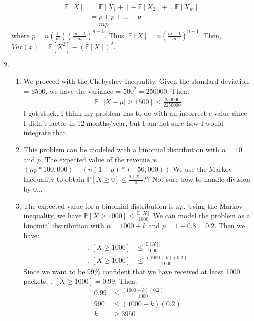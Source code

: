 \documentclass[a4paper]{article}
\newcommand{\E}{\mathbb{E}}
\renewcommand{\P}{\mathbb{P}}
\newcommand{\<}{\langle}
\renewcommand{\>}{\rangle}
\renewcommand{\^}{\wedge}
\begin{document}
\begin{enumerate}
\begin{align*}
            \E[X] &= \E[X_1 +] + \E[X_2] + ... \E[X_m]\\
            &= p + p + ... + p\\
            &= mp
        \end{align*}
    where $p = n(\frac{1}{m})(\frac{m-1}{m})^{n-1}$. Thus, $\E[X] = n(\frac{m-1}{m})^{n-1}$. Then, $Var(x) = \E[X^2] - (\E[X])^2$. 
    \item 
        \begin{enumerate}
            \item
                We proceed with the Chebyshev Inequality. Given the standard deviation = \$500, we have the variance = $500^2 = 250000$. Then:
                    \begin{align*}
                        \P[|X-\mu| \geq 1500] \leq \frac{250000}{2250000}
                    \end{align*}
                I got stuck. I think my problem has to do with an incorrect c value since I didn't factor in 12 months/year, but I am not sure how I would integrate that.
            \item
                This problem can be modeled with a binomial distribution with $n = 10$ and $p$. The expected value of the revenue is $(np * 100,000) - (n(1-p) * (-50,000))$ We use the Markov Inequality to obtain $\P[X \geq 0] \leq \frac{\E[X]}{0}$??
                Not sure how to handle division by 0...
            \item
                The expected value for a binomial distribution is $np$. Using the Markov inequality, we have $\P[X \geq 1000] \leq \frac{\E[X]}{1000}$ We can model the problem as a binomial distribution with $n = 1000 + k$ and $p = 1-0.8 = 0.2$. Then we have:
                    \begin{align*}
                        \P[X \geq 1000] &\leq \frac{\E[X]}{1000}\\
                        \P[X \geq 1000] &\leq \frac{(1000 + k)(0.2)}{1000}
                    \end{align*}
                Since we want to be 99\% confident that we have received at least 1000 packets, $\P[X \geq 1000] = 0.99$. Then:
                    \begin{align*}
                        0.99 &\leq \frac{(1000 + k)(0.2)}{1000}\\
                        990 &\leq (1000 + k)(0.2)\\
                        k &\geq 3950
                    \end{align*}

\end{enumerate}
\end{enumerate}
\end{document}

